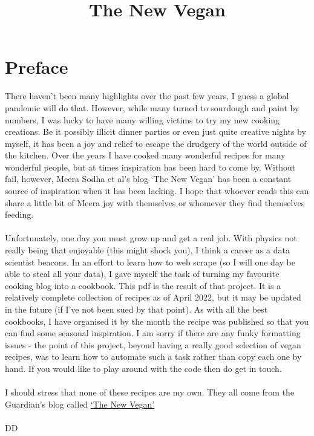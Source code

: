 \documentclass{book}
\title{The New Vegan}
\begin{document}
\frontmatter
\maketitle
\section*{Preface}
There haven't been many highlights over the past few years, I guess a global pandemic will do that. However, while many turned to sourdough and paint by numbers, I was lucky to have many willing victims to try my new cooking creations. Be it possibly illicit dinner parties or even just quite creative nights by myself, it has been a joy and relief to escape the drudgery of the world outside of the kitchen. Over the years I have cooked many wonderful recipes for many wonderful people, but at times inspiration has been hard to come by. Without fail, however, Meera Sodha et al's blog `The New Vegan' has been a constant source of inspiration when it has been lacking. I hope that whoever reads this can share a little bit of Meera joy with themselves or whomever they find themselves feeding. \\ \\ 
%
Unfortunately, one day you must grow up and get a real job. With physics not really being that enjoyable (this might shock you), I think a career as a data scientist beacons. In an effort to learn how to web scrape (so I will one day be able to steal all your data), I gave myself the task of turning my favourite cooking blog into a cookbook. This pdf is the result of that project. It is a relatively complete collection of recipes as of April 2022, but it may be updated in the future (if I've not been sued by that point). As with all the best cookbooks, I have organised it by the month the recipe was published so that you can find some seasonal inspiration. I am sorry if there are any funky formatting issues - the point of this project, beyond having a really good selection of vegan recipes, was to learn how to automate such a task rather than copy each one by hand. If you would like to play around with the code then do get in touch. \\ \\
%
I should stress that none of these recipes are my own. They all come from the Guardian's blog called \href{https://www.theguardian.com/food/series/the-new-vegan}{`The New Vegan'} \\ \\
%
DD 

\tableofcontents

\mainmatter
\end{document}
